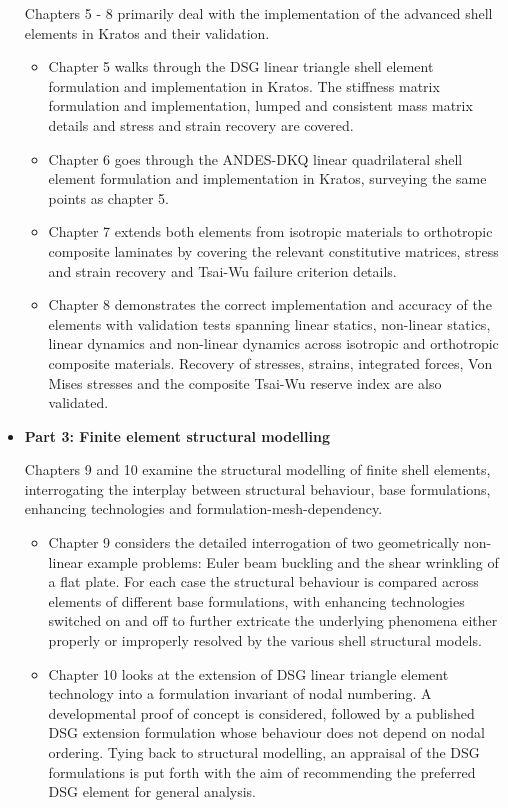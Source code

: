 \begin{itemize}
	Chapters 5 - 8 primarily deal with the implementation of the advanced shell elements in Kratos and their validation.
	\begin{itemize}
		\item Chapter 5 walks through the DSG linear triangle shell element formulation and implementation in Kratos. The stiffness matrix formulation and implementation, lumped and consistent mass matrix details and stress and strain recovery are covered.
		\item Chapter 6 goes through the ANDES-DKQ linear quadrilateral shell element formulation and implementation in Kratos, surveying the same points as chapter 5.
		\item Chapter 7 extends both elements from isotropic materials to orthotropic composite laminates by covering the relevant constitutive matrices, stress and strain recovery and Tsai-Wu failure criterion details.
		\item Chapter 8 demonstrates the correct implementation and accuracy of the elements with validation tests spanning linear statics, non-linear statics, linear dynamics and non-linear dynamics across isotropic and orthotropic composite materials. Recovery of stresses, strains, integrated forces, Von Mises stresses and the composite Tsai-Wu reserve index are also validated.
	\end{itemize}
	\newpage
	\item \textbf{Part 3: Finite element structural modelling}
	
	Chapters 9 and 10 examine the structural modelling of finite shell elements, interrogating the interplay between structural behaviour, base formulations, enhancing technologies and formulation-mesh-dependency.
	\begin{itemize}
		\item Chapter 9 considers the detailed interrogation of two geometrically non-linear example problems: Euler beam buckling and the shear wrinkling of a flat plate. For each case the structural behaviour is compared across elements of different base formulations, with enhancing technologies switched on and off to further extricate the underlying phenomena either properly or improperly resolved by the various shell structural models.
		\item Chapter 10 looks at the extension of DSG linear triangle element technology into a formulation invariant of nodal numbering. A developmental proof of concept is considered, followed by a published DSG extension formulation whose behaviour does not depend on nodal ordering. Tying back to structural modelling, an appraisal of the DSG formulations is put forth with the aim of recommending the preferred DSG element for general analysis.
	\end{itemize}
\end{itemize}


